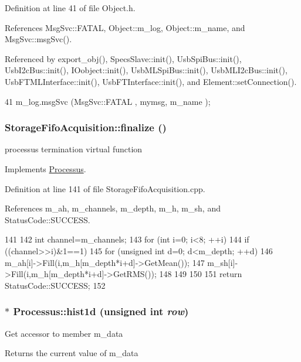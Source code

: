 Definition at line 41 of file Object.h.

References MsgSvc::FATAL, Object::m\_\-log, Object::m\_\-name, and MsgSvc::msgSvc().

Referenced by export\_\-obj(), SpecsSlave::init(), UsbSpiBus::init(), UsbI2cBus::init(), IOobject::init(), UsbMLSpiBus::init(), UsbMLI2cBus::init(), UsbFTMLInterface::init(), UsbFTInterface::init(), and Element::setConnection().


\begin{DoxyCode}
41 { m_log.msgSvc (MsgSvc::FATAL   , mymsg, m_name ); }
\end{DoxyCode}
\hypertarget{classStorageFifoAcquisition_acb6eee350941bc44e2a4cb768b359d4f}{
\subsubsection[{finalize}]{ StorageFifoAcquisition::finalize ()}}
\label{classStorageFifoAcquisition_acb6eee350941bc44e2a4cb768b359d4f}
processus termination virtual function 

Implements \hyperlink{classProcessus_aba93d691f031bdb18ae4b8afb1b2e856}{Processus}.

Definition at line 141 of file StorageFifoAcquisition.cpp.

References m\_\-ah, m\_\-channels, m\_\-depth, m\_\-h, m\_\-sh, and StatusCode::SUCCESS.


\begin{DoxyCode}
141                                               {
142   int channel=m_channels;
143   for (int i=0; i<8; ++i){
144     if ((channel>>i)&1==1){
145       for (unsigned int d=0; d<m_depth; ++d){
146     m_ah[i]->Fill(i,m_h[m_depth*i+d]->GetMean());
147     m_sh[i]->Fill(i,m_h[m_depth*i+d]->GetRMS());
148       }
149     }
150   } 
151   return StatusCode::SUCCESS;
152 }
\end{DoxyCode}
\hypertarget{classProcessus_a409227db936baff03c0462c1bcfe8069}{
\subsubsection[{hist1d}]{$\ast$ Processus::hist1d (unsigned int {\em row})}}
\label{classProcessus_a409227db936baff03c0462c1bcfe8069}
Get accessor to member m\_\-data \begin{DoxyReturn}{Returns}
the current value of m\_\-data 
\end{DoxyReturn}


